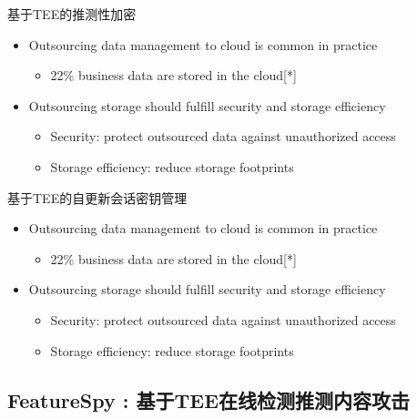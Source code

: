 \documentclass{beamer}
\newcommand{\sysnameF}{FeatureSpy }
\begin{document}
\begin{frame}{基于TEE的推测性加密}
    \begin{itemize}
        \item Outsourcing data management to cloud is common in practice
              \begin{itemize}
                  \item 22\% business data are stored in the cloud[*]
              \end{itemize}
        \item  Outsourcing storage should fulfill security and storage efficiency
              \begin{itemize}
                  \item  Security: protect outsourced data against unauthorized access
                  \item  Storage efficiency: reduce storage footprints
              \end{itemize}
    \end{itemize}
\end{frame}

\begin{frame}{基于TEE的自更新会话密钥管理}
    \begin{itemize}
        \item Outsourcing data management to cloud is common in practice
              \begin{itemize}
                  \item 22\% business data are stored in the cloud[*]
              \end{itemize}
        \item  Outsourcing storage should fulfill security and storage efficiency
              \begin{itemize}
                  \item  Security: protect outsourced data against unauthorized access
                  \item  Storage efficiency: reduce storage footprints
              \end{itemize}
    \end{itemize}
\end{frame}

\subsection{\sysnameF: 基于TEE在线检测推测内容攻击}
\end{document}
